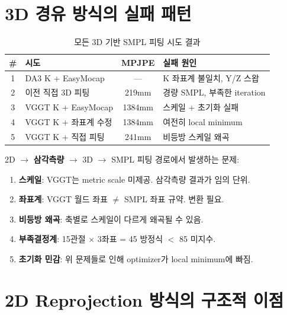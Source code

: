 \documentclass[11pt, a4paper]{report}
\begin{document}
\section{3D 경유 방식의 실패 패턴}

\begin{table}[H]
\centering
\caption{모든 3D 기반 SMPL 피팅 시도 결과}
\renewcommand{\arraystretch}{1.4}
\small
\begin{tabular}{c p{4.5cm} c p{4.5cm}}
\toprule
\textbf{\#} & \textbf{시도} & \textbf{MPJPE} & \textbf{실패 원인} \\
\midrule
1 & DA3 K + EasyMocap & --- & K 좌표계 불일치, Y/Z 스왑 \\
2 & 이전 직접 3D 피팅 & 219mm & 경량 SMPL, 부족한 iteration \\
3 & VGGT K + EasyMocap & 1384mm & 스케일 + 초기화 실패 \\
4 & VGGT K + 좌표계 수정 & 1384mm & 여전히 local minimum \\
5 & VGGT K + 직접 피팅 & 241mm & 비등방 스케일 왜곡 \\
\bottomrule
\end{tabular}
\end{table}

\begin{warningbox}[title={3D 경유 방식의 구조적 한계}]
2D $\rightarrow$ \textbf{삼각측량} $\rightarrow$ 3D $\rightarrow$ SMPL 피팅 경로에서 발생하는 문제:
\begin{enumerate}[leftmargin=*]
  \item \textbf{스케일}: VGGT는 metric scale 미제공. 삼각측량 결과가 임의 단위.
  \item \textbf{좌표계}: VGGT 월드 좌표 $\neq$ SMPL 좌표 규약. 변환 필요.
  \item \textbf{비등방 왜곡}: 축별로 스케일이 다르게 왜곡될 수 있음.
  \item \textbf{부족결정계}: 15관절 $\times$ 3좌표 = 45 방정식 $<$ 85 미지수.
  \item \textbf{초기화 민감}: 위 문제들로 인해 optimizer가 local minimum에 빠짐.
\end{enumerate}
\end{warningbox}

\section{2D Reprojection 방식의 구조적 이점}
\end{document}
